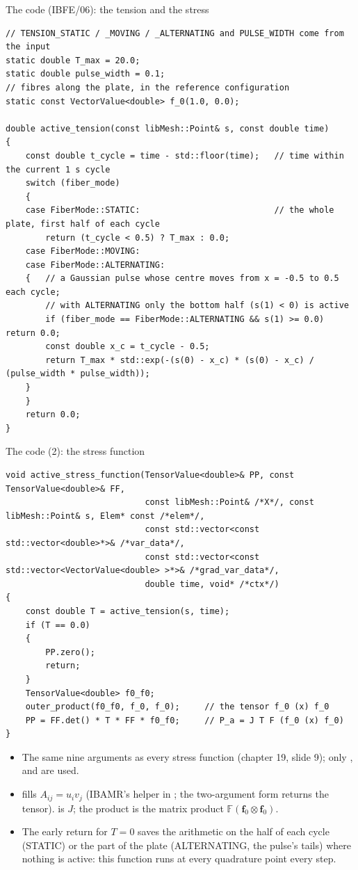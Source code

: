 \documentclass[aspectratio=169,11pt]{beamer}
\begin{document}
\begin{frame}[fragile]{The code (IBFE/06): the tension and the stress}
\label{fr:code}
\begin{lstlisting}[style=cpptiny]
// TENSION_STATIC / _MOVING / _ALTERNATING and PULSE_WIDTH come from the input
static double T_max = 20.0;
static double pulse_width = 0.1;
// fibres along the plate, in the reference configuration
static const VectorValue<double> f_0(1.0, 0.0);

double active_tension(const libMesh::Point& s, const double time)
{
    const double t_cycle = time - std::floor(time);   // time within the current 1 s cycle
    switch (fiber_mode)
    {
    case FiberMode::STATIC:                           // the whole plate, first half of each cycle
        return (t_cycle < 0.5) ? T_max : 0.0;
    case FiberMode::MOVING:
    case FiberMode::ALTERNATING:
    {   // a Gaussian pulse whose centre moves from x = -0.5 to 0.5 each cycle;
        // with ALTERNATING only the bottom half (s(1) < 0) is active
        if (fiber_mode == FiberMode::ALTERNATING && s(1) >= 0.0) return 0.0;
        const double x_c = t_cycle - 0.5;
        return T_max * std::exp(-(s(0) - x_c) * (s(0) - x_c) / (pulse_width * pulse_width));
    }
    }
    return 0.0;
}
\end{lstlisting}
\end{frame}

\begin{frame}[fragile]{The code (2): the stress function}
\label{fr:code2}
\begin{lstlisting}[style=cpptiny]
void active_stress_function(TensorValue<double>& PP, const TensorValue<double>& FF,
                            const libMesh::Point& /*X*/, const libMesh::Point& s, Elem* const /*elem*/,
                            const std::vector<const std::vector<double>*>& /*var_data*/,
                            const std::vector<const std::vector<VectorValue<double> >*>& /*grad_var_data*/,
                            double time, void* /*ctx*/)
{
    const double T = active_tension(s, time);
    if (T == 0.0)
    {
        PP.zero();
        return;
    }
    TensorValue<double> f0_f0;
    outer_product(f0_f0, f_0, f_0);     // the tensor f_0 (x) f_0
    PP = FF.det() * T * FF * f0_f0;     // P_a = J T F (f_0 (x) f_0)
}
\end{lstlisting}
\footnotesize
\begin{itemize}
  \item The same nine arguments as every stress function (chapter 19, slide 9); only ,  and  are used.
  \item {} fills $A_{ij} = u_iv_j$ (IBAMR's helper in ; the two-argument form returns the tensor).  is $J$; the product  is the matrix product $\mathbb{F}(\mathbf{f}_0\otimes\mathbf{f}_0)$.
  \item The early return for $T = 0$ saves the arithmetic on the half of each cycle (STATIC) or the part of the plate (ALTERNATING, the pulse's tails) where nothing is active: this function runs at every quadrature point every step.
\end{itemize}
\end{frame}
\end{document}
